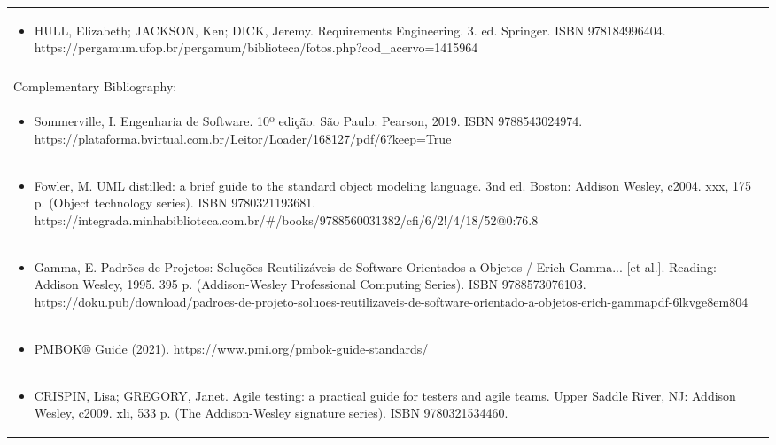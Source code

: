 \documentclass[11pt]{article}
\begin{document}
\begin{center}
\begin{longtable}{|p{4cm}|p{4cm}|p{4cm}|p{4cm}|}
\multicolumn{4}{|p{\dimexpr 16cm + 6\tabcolsep\relax}|}{\begin{itemize}\item HULL, Elizabeth; JACKSON, Ken; DICK, Jeremy. Requirements Engineering. 3. ed. Springer. ISBN 978184996404. https://pergamum.ufop.br/pergamum/biblioteca/fotos.php?cod\_acervo=1415964\end{itemize}}\\
\multicolumn{4}{|p{16cm}|}{}\\
\hline
\multicolumn{4}{|p{16cm}|}{Complementary Bibliography:}\\*
\multicolumn{4}{|p{\dimexpr 16cm + 6\tabcolsep\relax}|}{\begin{itemize}\item Sommerville, I. Engenharia de Software. 10º edição. São Paulo: Pearson, 2019. ISBN 9788543024974. https://plataforma.bvirtual.com.br/Leitor/Loader/168127/pdf/6?keep=True\end{itemize}}\\
\multicolumn{4}{|p{\dimexpr 16cm + 6\tabcolsep\relax}|}{\begin{itemize}\item Fowler, M. UML distilled: a brief guide to the standard object modeling language. 3nd ed. Boston: Addison Wesley, c2004. xxx, 175 p. (Object technology series). ISBN 9780321193681. https://integrada.minhabiblioteca.com.br/\#/books/9788560031382/cfi/6/2!/4/18/52@0:76.8\end{itemize}}\\
\multicolumn{4}{|p{\dimexpr 16cm + 6\tabcolsep\relax}|}{\begin{itemize}\item Gamma, E. Padrões de Projetos: Soluções Reutilizáveis de Software Orientados a Objetos / Erich Gamma... [et al.]. Reading: Addison Wesley, 1995. 395 p. (Addison-Wesley Professional Computing Series). ISBN 9788573076103. https://doku.pub/download/padroes-de-projeto-soluoes-reutilizaveis-de-software-orientado-a-objetos-erich-gammapdf-6lkvge8em804\end{itemize}}\\
\multicolumn{4}{|p{\dimexpr 16cm + 6\tabcolsep\relax}|}{\begin{itemize}\item PMBOK® Guide (2021). https://www.pmi.org/pmbok-guide-standards/\end{itemize}}\\
\multicolumn{4}{|p{\dimexpr 16cm + 6\tabcolsep\relax}|}{\begin{itemize}\item CRISPIN, Lisa; GREGORY, Janet. Agile testing: a practical guide for testers and agile teams. Upper Saddle River, NJ: Addison Wesley, c2009. xli, 533 p. (The Addison-Wesley signature series). ISBN 9780321534460.\end{itemize}}\\
\hline
\end{longtable}
\end{center}
\end{document}
